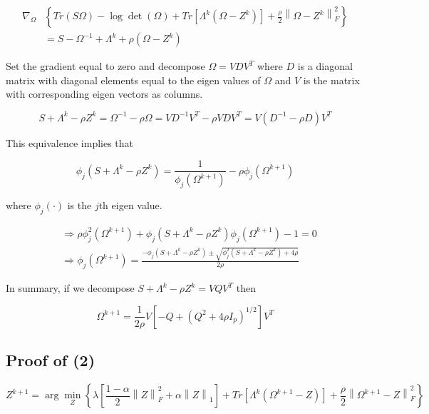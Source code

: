 \documentclass[12pt,]{book}
\theoremstyle{definition}
\theoremstyle{definition}
\theoremstyle{definition}
\theoremstyle{remark}
\begin{document}
\begin{align*}
  \nabla_{\Omega}&\left\{ Tr\left(S\Omega\right) - \log\det\left(\Omega\right) + Tr\left[\Lambda^{k}\left(\Omega - Z^{k}\right)\right] + \frac{\rho}{2}\left\| \Omega - Z^{k} \right\|_{F}^{2} \right\} \\
  &= S - \Omega^{-1} + \Lambda^{k} + \rho\left( \Omega - Z^{k} \right)
\end{align*}

Set the gradient equal to zero and decompose \(\Omega = VDV^{T}\) where
\(D\) is a diagonal matrix with diagonal elements equal to the eigen
values of \(\Omega\) and \(V\) is the matrix with corresponding eigen
vectors as columns.

\[ S + \Lambda^{k} - \rho Z^{k} = \Omega^{-1} - \rho \Omega = VD^{-1}V^{T} - \rho VDV^{T} =  V\left(D^{-1} - \rho D\right)V^{T} \]

This equivalence implies that

\[ \phi_{j}\left( S + \Lambda^{k} - \rho Z^{k} \right) = \frac{1}{\phi_{j}(\Omega^{k + 1})} - \rho\phi_{j}(\Omega^{k + 1}) \]

where \(\phi_{j}(\cdot)\) is the \(j\)th eigen value.

\begin{align*}
  &\Rightarrow \rho\phi_{j}^{2}(\Omega^{k + 1}) + \phi_{j}\left( S + \Lambda^{k} - \rho Z^{k} \right)\phi_{j}(\Omega^{k + 1}) - 1 = 0 \\
  &\Rightarrow \phi_{j}(\Omega^{k + 1}) = \frac{-\phi_{j}(S + \Lambda^{k} - \rho Z^{k}) \pm \sqrt{\phi_{j}^{2}(S + \Lambda^{k} - \rho Z^{k}) + 4\rho}}{2\rho}
\end{align*}

In summary, if we decompose \(S + \Lambda^{k} - \rho Z^{k} = VQV^{T}\)
then

\[ \Omega^{k + 1} = \frac{1}{2\rho}V\left[ -Q + (Q^{2} + 4\rho I_{p})^{1/2}\right] V^{T} \]

\vspace{1cm}

\hypertarget{proof-of-2}{%
\subsection{Proof of (2)}\label{proof-of-2}}

\[ Z^{k + 1} = \arg\min_{Z}\left\{ \lambda\left[ \frac{1 - \alpha}{2}\left\| Z \right\|_{F}^{2} + \alpha\left\| Z \right\|_{1} \right] + Tr\left[\Lambda^{k}\left(\Omega^{k + 1} - Z\right)\right] + \frac{\rho}{2}\left\| \Omega^{k + 1} - Z \right\|_{F}^{2} \right\} \]
\end{document}
